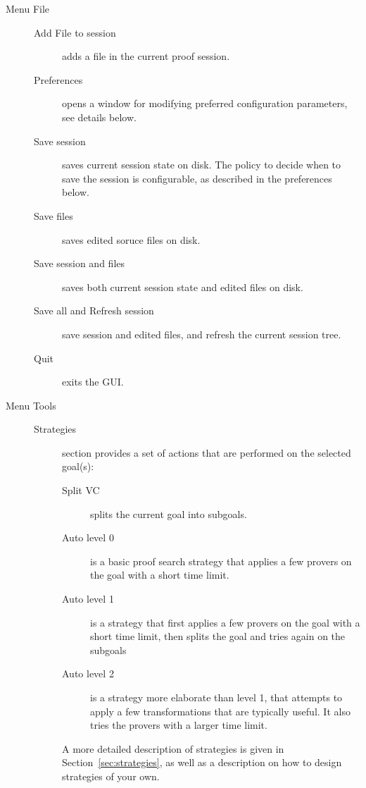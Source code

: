 \begin{description}
\item[Menu \textsf{File}]\emptyitem
\begin{description}
\item[Add File to session] adds a file in the current proof session.
\item[Preferences] opens a window for modifying preferred
  configuration parameters, see details below.
\item[Save session] saves current session state on disk. The policy to decide when to save the session is configurable, as described in the preferences below.
\item[Save files] saves edited soruce files on disk.
\item[Save session and files] saves both current session state and edited files on disk.
\item[Save all and Refresh session] save session and edited files, and refresh the current session tree.
\item[Quit] exits the GUI.
\end{description}

\item[Menu \textsf{Tools}]\emptyitem
\begin{description}
\item[Strategies] section provides a set of actions that are
  performed on the selected goal(s):
  \begin{description}
  \item[Split VC] splits the current goal into subgoals.
  \item[Auto level 0] is a basic proof search strategy that applies a few provers
    on the goal with a short time limit.
  \item[Auto level 1] is a strategy that first applies a few provers
    on the goal with a short time limit, then splits the goal and
    tries again on the subgoals
  \item[Auto level 2] is a strategy more elaborate than level 1, that
    attempts to apply a few transformations that are typically
    useful. It also tries the provers with a larger time limit.
  \end{description}
  A more detailed description of strategies is given in
  Section~\ref{sec:strategies}, as well as a description on how to
  design strategies of your own.


\end{description}
\end{description}
